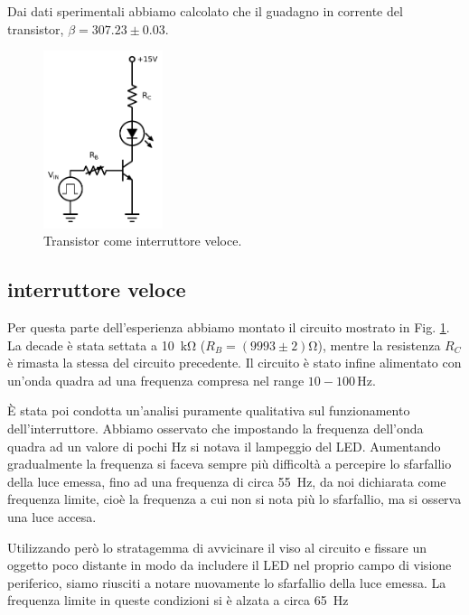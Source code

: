 Dai dati sperimentali abbiamo calcolato che il guadagno in corrente del transistor, $\beta=307.23 \pm 0.03$.
\newpage
\begin{figure}
	\includegraphics[width=35mm]{cc2.pdf}
	\caption{Transistor come interruttore veloce.}
	\label{fig:cc2}
\end{figure}
\subsection{interruttore veloce}
Per questa parte dell'esperienza abbiamo montato il circuito mostrato in Fig. \ref{fig:cc2}.
La decade è stata settata a \SI{10}{\kilo\ohm} ($R_B = (9993 \pm 2)\si{\ohm}$), mentre la resistenza $R_C$ è rimasta la stessa del circuito precedente.
Il circuito è stato infine alimentato con un'onda quadra ad una frequenza compresa nel range $10-100\,\si{\hertz}$. %

È stata poi condotta un'analisi puramente qualitativa sul funzionamento dell'interruttore. Abbiamo osservato che impostando la frequenza dell'onda quadra ad un valore di pochi \si{\hertz} si notava il lampeggio del LED. Aumentando gradualmente la frequenza si faceva sempre più difficoltà a percepire lo sfarfallio della luce emessa, fino ad una frequenza di circa \SI{55}{\hertz}, da noi dichiarata come frequenza limite, cioè la frequenza a cui non si nota più lo sfarfallio, ma si osserva una luce accesa.

Utilizzando però lo stratagemma di avvicinare il viso al circuito e fissare un oggetto poco distante in modo da includere il LED nel proprio campo di visione periferico, siamo riusciti a notare nuovamente lo sfarfallio della luce emessa. La frequenza limite in queste condizioni si è alzata a circa \SI{65}{\hertz}